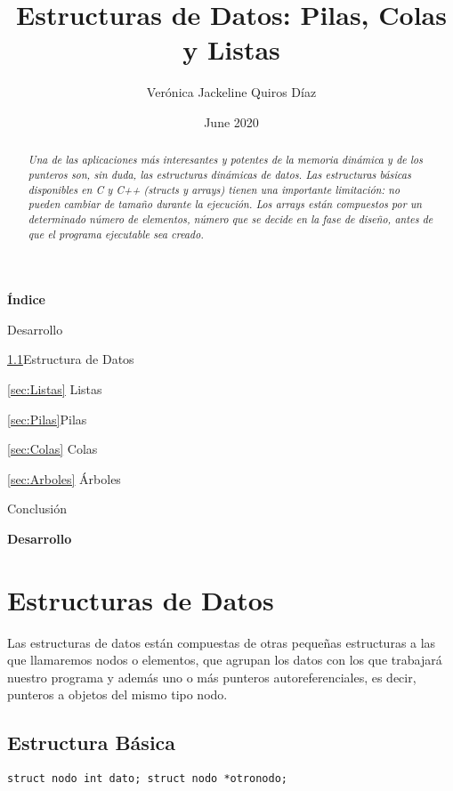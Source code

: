\documentclass{article}
\title{Estructuras de Datos: Pilas, Colas y Listas}
\author{Verónica Jackeline Quiros Díaz }
\date{\Large June 2020}
\begin{document}
\maketitle
\begin{abstract}%
   \emph{Una de las aplicaciones más interesantes y potentes de la memoria dinámica y de los punteros son, sin duda, las estructuras dinámicas de datos. Las estructuras básicas disponibles en C y C++ (structs y arrays) tienen una importante limitación: no pueden cambiar de tamaño durante la ejecución. Los arrays están compuestos por un determinado número de elementos, número que se decide en la fase de diseño, antes de que el programa ejecutable sea creado.}
\end{abstract}
\vfill
{\textbf{\Large \'Indice}}
\begin{description}
\item Desarrollo
\item \ref{sec:EstructuraBasica}Estructura de Datos%
\item \ref{sec:Listas} Listas
\item \ref{sec:Pilas}Pilas
\item \ref{sec:Colas} Colas
\item \ref{sec:Arboles} Árboles
\item Conclusión
\end{description}
\vfill
\vfill
\textbf{\Large Desarrollo}
\section{Estructuras de Datos}
\begin{flushleft} Las estructuras de datos están compuestas de otras pequeñas estructuras a las que llamaremos nodos o elementos, que agrupan los datos con los que trabajará nuestro programa y además uno o más punteros autoreferenciales, es decir, punteros a objetos del mismo tipo nodo.
\end{flushleft}
\subsection{Estructura Básica}\label{sec:EstructuraBasica}
\begin{center}
\texttt{struct nodo 
   int dato;
   struct nodo *otronodo;}
\end{center}
\end{document}
